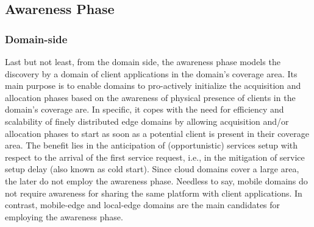



\subsection{Awareness Phase}\label{sec:A3-E-awareness}




\subsubsection*{Domain-side} Last but not least, from the domain side, the awareness phase models the discovery by a domain of client applications in the domain's coverage area. Its main purpose is to enable domains to pro-actively initialize the acquisition and allocation phases based on the awareness of physical presence of clients in the domain's coverage are. In specific, it copes with the need for efficiency and scalability of finely distributed edge domains by allowing acquisition and/or allocation phases to start as soon as a potential client is present in their coverage area. The benefit lies in the anticipation of (opportunistic) services setup with respect to the arrival of the first service request, i.e., in the mitigation of service setup delay (also known as cold start). Since cloud domains cover a large area, the later do not employ the awareness phase. Needless to say, mobile domains do not require awareness for sharing the same platform with client applications. In contrast, mobile-edge and local-edge domains are the main candidates for employing the awareness phase. 

